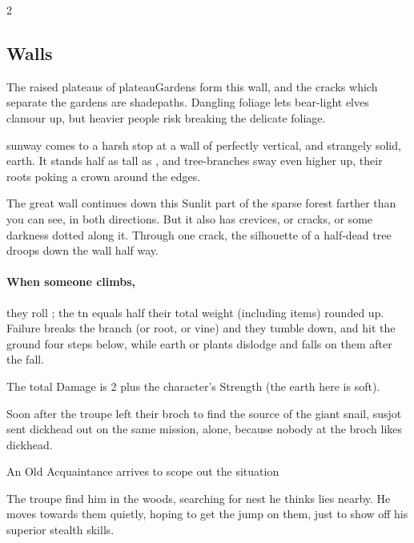 \begin{multicols}{2}

\subsection{ Walls}

The raised plateaus of \gls{plateauGardens} form this wall, and the cracks which separate the gardens are \gls{shadepaths}.
Dangling foliage lets bear-light elves clamour up, but heavier people risk breaking the delicate foliage.

\begin{boxtext}
  \Gls{sunway} comes to a harsh stop at a wall of perfectly vertical, and strangely solid, earth.
  It stands half as tall as , and tree-branches sway even higher up, their roots poking a crown around the edges.

  The great wall continues down this Sunlit part of the sparse forest farther than you can see, in both directions.
  But it also has crevices, or cracks, or some darkness dotted along it.
  Through one crack, the silhouette of a half-dead tree droops down the wall half way.
\end{boxtext}

\paragraph{When someone climbs,}
they roll ; the \gls{tn} equals half their total \gls{weight} (including items) rounded up.
Failure breaks the branch (or root, or vine) and they tumble down, and hit the ground four \glspl{step} below, while earth or plants dislodge and falls on them after the fall.
\label{climbingWalls}

The total Damage is 2 plus the character's Strength (the earth here is soft).


\noindent
Soon after the troupe left their \gls{broch} to find the source of the giant snail, \gls{susjot} sent \gls{dickhead} out on the same mission, alone, because nobody at the \gls{broch} likes \gls{dickhead}.

{An Old Acquaintance}%
{ arrives to scope out the situation}%

The troupe find him in the woods, searching for  nest he thinks lies nearby.
He moves towards them quietly, hoping to get the jump on them, just to show off his superior stealth \glspl{skill}.


\end{multicols}
